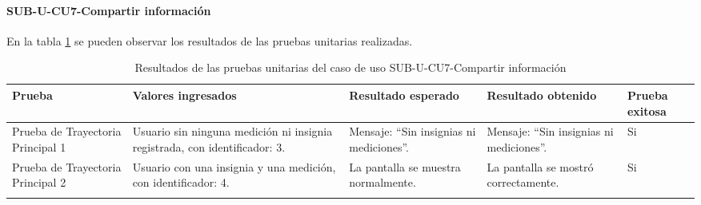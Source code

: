 \paragraph{SUB-U-CU7-Compartir información}\label{SUB-U-CU7:Pruebas}
En la tabla \ref{pruebas_unitarias_sub-u-cu7} se pueden observar los resultados de las pruebas unitarias realizadas.
\begin{longtable}{|M{2cm}| M{4.5cm}|M{3cm}|M{3cm}|M{1.5cm}|}
	\hline
	\textbf{Prueba} & \textbf{Valores ingresados} & \textbf{Resultado esperado} & \textbf{Resultado obtenido} & \textbf{Prueba exitosa} \\ \hline
	Prueba de Trayectoria Principal 1 & Usuario sin ninguna medición ni insignia registrada, con identificador: 3.
	& 
	Mensaje: ``Sin insignias ni mediciones''.
	&
	Mensaje: ``Sin insignias ni mediciones''.
	& Si \\ \hline

	Prueba de Trayectoria Principal 2 & Usuario con una insignia y una medición, con identificador: 4.
	& 
	La pantalla se muestra normalmente.
	&
	La pantalla se mostró correctamente.
	& Si \\ \hline

	\caption{Resultados de las pruebas unitarias del caso de uso SUB-U-CU7-Compartir información}
	\label{pruebas_unitarias_sub-u-cu7}
\end{longtable}
